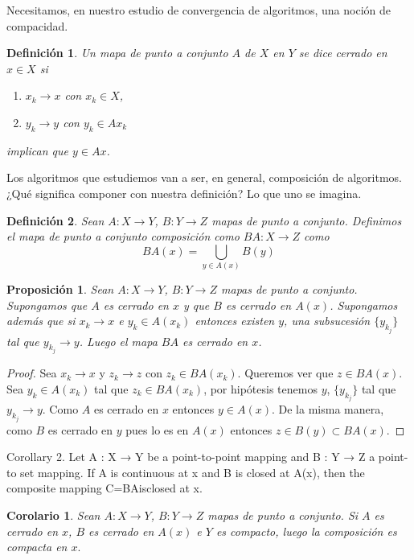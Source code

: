 \documentclass[11pt]{article}
\theoremstyle{ejstyle}
\theoremstyle{ejstyle}
\newtheorem{definicion}{Definición}
\theoremstyle{ejstyle}
\theoremstyle{ejstyle}
\theoremstyle{ejstyle}
\newtheorem{prop}{Proposición}
\theoremstyle{ejstyle}
\theoremstyle{ejstyle}
\newtheorem{coro}{Corolario}
\begin{document}
	Necesitamos, en nuestro estudio de convergencia de algoritmos, una noción
	de compacidad.
	
	\begin{definicion}
		Un mapa de punto a conjunto $A$ de $X$ en $Y$ se dice cerrado en $x \in X$ si
		\begin{enumerate}
			\item $x_k \to x$ con $x_k \in X$,
			\item $y_k \to y$ con $y_k \in Ax_k$ 
		\end{enumerate}
		implican que $y \in Ax$.
	\end{definicion}

	Los algoritmos que estudiemos van a ser, en general, composición de algoritmos. ¿Qué significa 
	componer con nuestra definición? Lo que uno se imagina.
	
	\begin{definicion}
		Sean $A : X \to Y$, $B: Y \to Z$ mapas de punto a conjunto. Definimos el mapa de punto a conjunto
		composición como $BA : X \to Z$ como
		$$
		BA(x) = \bigcup_{y \in A(x)} B(y)
		$$
	\end{definicion}
	
	
	\begin{prop}
		Sean $A: X \to Y$, $B : Y \to Z$ mapas de punto a conjunto. Supongamos que $A$ es cerrado en $x$ 
		y que $B$ es cerrado en $A(x)$. Supongamos además que si $x_k \to x$ e $y_k \in A(x_k)$ entonces existen $y$, una subsucesión $\{ y_{k_j}\}$ tal que $y_{k_j} \to y$. Luego el mapa $BA$ es cerrado en $x$.  
	\end{prop}
	
	\begin{proof}
		Sea $x_k \to x$ y $z_k \to z$ con $z_k \in BA(x_k)$. Queremos ver que $z \in BA(x)$.
		Sea $y_k \in A(x_k)$ tal que $z_k \in BA(x_k)$, por hipótesis tenemos $y$, $\{y_{k_j}\}$
		tal que $y_{k_j} \to y$. Como $A$ es cerrado en $x$ entonces $y \in A(x)$. De la misma manera, 
		como $B$ es cerrado en $y$ pues lo es en $A(x)$ entonces $z \in B(y) \subset BA(x).$
	\end{proof}
	
	Corollary 2. Let A : X → Y be a point-to-point mapping and B : Y → Z a point-to
	set mapping. If A is continuous at x and B is closed at A(x), then the composite mapping
	C=BAisclosed at x.
	
	
	\begin{coro}
		Sean $A: X \to Y$, $B : Y \to Z$ mapas de punto a conjunto. Si $A$ es cerrado en $x$, $B$ es
		cerrado en $A(x)$ e $Y$ es compacto, luego la composición es compacta en $x.$
	\end{coro}
	
\end{document}
